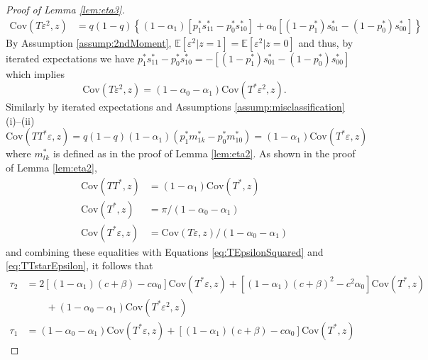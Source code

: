 \documentclass[12pt]{article}
\begin{document}
\begin{proof}[Proof of Lemma \ref{lem:eta3}]
\begin{align*}
  \mbox{Cov}(T\varepsilon^2, z) %
  &= q(1 - q)\left\{ (1 - \alpha_1)\left[p^*_1 s_{11}^* - p_0^* s_{10}^*\right] + \alpha_0 \left[ (1 - p_1^*)s_{01}^* - (1 - p_0^*) s_{00}^*\right] \right\}
\end{align*}
By Assumption \ref{assump:2ndMoment}, $\mathbb{E}[\varepsilon^2|z=1] = \mathbb{E}[\varepsilon^2|z=0]$ and thus, by iterated expectations we have
$p_1^* s_{11}^* - p_0^* s^*_{10} =  - \left[(1 - p_1^*)s_{01}^* - (1 - p_0^*)s_{00}^* \right]$
which implies 
\begin{equation}
  \mbox{Cov}(T\varepsilon^2,z) = (1 - \alpha_0 - \alpha_1)\mbox{Cov}(T^*\varepsilon^2,z).
  \label{eq:TEpsilonSquared}
\end{equation}
Similarly by iterated expectations and Assumptions \ref{assump:misclassification} (i)--(ii)
\begin{equation}
  \mbox{Cov}(TT^*\varepsilon, z) = q(1 - q)(1 - \alpha_1)(p_1^* m_{1k}^* - p_0^* m_{10}^*) = (1 - \alpha_1) \mbox{Cov}(T^*\varepsilon, z) 
  \label{eq:TTstarEpsilon}
\end{equation}
where $m_{tk}^*$ is defined as in the proof of Lemma \ref{lem:eta2}.
As shown in the proof of Lemma \ref{lem:eta2}, 
\begin{align*}
  \mbox{Cov}(TT^*,z) &= (1 - \alpha_1) \mbox{Cov}(T^*,z)\\ 
  \mbox{Cov}(T^*,z) &= \pi / (1 - \alpha_0 - \alpha_1)\\
  \mbox{Cov}(T^*\varepsilon,z) &= \mbox{Cov}(T\varepsilon,z) / (1 - \alpha_0 - \alpha_1)
\end{align*}
and combining these equalities with Equations \ref{eq:TEpsilonSquared} and \ref{eq:TTstarEpsilon}, it follows that
\begin{align*}
  \tau_2 &=  2\left[(1 - \alpha_1)(c + \beta) - c \alpha_0\right]\mbox{Cov}(T^*\varepsilon,z) + \left[(1 - \alpha_1)(c + \beta)^2 - c^2 \alpha_0 \right]\mbox{Cov}(T^*,z)\\
  &\quad \quad +(1 - \alpha_0 - \alpha_1)\mbox{Cov}(T^*\varepsilon^2,z) \\
  \tau_1 &= (1 - \alpha_0 - \alpha_1)\mbox{Cov}(T^*\varepsilon,z) + \left[(1 - \alpha_1)(c + \beta) - c \alpha_0\right] \mbox{Cov}(T^*,z)

\end{align*}
\end{proof}
\end{document}

